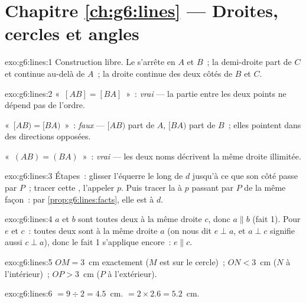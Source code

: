 \section*{Chapitre \ref{ch:g6:lines} --- Droites, cercles et angles}

\begin{solution}{exo:g6:lines:1}
Construction libre. Le  s'arrête en $A$ et $B$~; la
demi-droite part de $C$ et continue au-delà de $A$~; la droite
continue des deux côtés de $B$ et $C$.
\end{solution}

\begin{solution}{exo:g6:lines:2}
«~$[AB] = [BA]$~»~: \emph{vrai} --- la partie entre les deux points
ne dépend pas de l'ordre.

«~$[AB) = [BA)$~»~: \emph{faux} --- $[AB)$ part de $A$, $[BA)$ part
de $B$~; elles pointent dans des directions opposées.

«~$(AB) = (BA)$~»~: \emph{vrai} --- les deux noms décrivent la même
droite illimitée.
\end{solution}

\begin{solution}{exo:g6:lines:3}
Étapes~: glisser l'équerre le long de $d$ jusqu'à ce que son côté
 passe par $P$~; tracer cette , l'appeler
$p$. Puis tracer la  à $p$ passant par $P$ de la même
façon~: par \cref{prop:g6:lines:facts}, elle est  à $d$.
\end{solution}

\begin{solution}{exo:g6:lines:4}
$a$ et $b$ sont toutes deux  à la même droite $c$,
donc $a \parallel b$ (fait 1). Pour $e$ et $c$~: toutes deux sont
 à la même droite $a$ (on nous dit $e \perp a$, et
$a \perp c$ signifie aussi $c \perp a$), donc le fait 1 s'applique
encore~: $e \parallel c$.
\end{solution}

\begin{solution}{exo:g6:lines:5}
$OM = 3$~cm exactement ($M$ est sur le cercle)~; $ON < 3$~cm ($N$
à l'intérieur)~; $OP > 3$~cm ($P$ à l'extérieur).
\end{solution}

\begin{solution}{exo:g6:lines:6}
 $= 9 \div 2 = 4.5$~cm. \quad {} $= 2 \times 2.6 = 5.2$~cm.
\end{solution}

